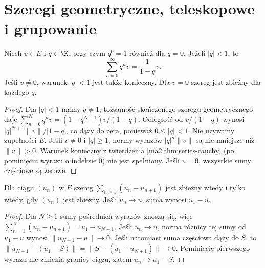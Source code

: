 \section{Szeregi geometryczne, teleskopowe i grupowanie}
\begin{twierdzenie}
\label{ma2:thm:vector-geometric}
Niech $v\in E$ i $q\in\K$, przy czym $q^0=1$ również dla $q=0$.
Jeżeli $|q|<1$, to
\[
 \sum_{n=0}^{\infty}q^n v=\frac{1}{1-q}v.
\]
Jeśli $v\ne0$, warunek $|q|<1$ jest także konieczny.
Dla $v=0$ szereg jest zbieżny dla każdego $q$.
\end{twierdzenie}
\begin{proof}
Dla $|q|<1$ mamy $q\ne1$; tożsamość skończonego szeregu
geometrycznego daje
$\sum_{n=0}^N q^n v=(1-q^{N+1})v/(1-q)$.
Odległość od $v/(1-q)$ wynosi
$|q|^{N+1}\|v\|/|1-q|$, co dąży do zera, ponieważ
$0\le |q|<1$. Nie używamy zupełności $E$.
Jeśli $v\ne0$ i $|q|\ge1$, normy wyrazów
$|q|^n\|v\|$ są nie mniejsze niż $\|v\|>0$.
Warunek konieczny z twierdzenia \ref{ma2:thm:series-cauchy}
(po pominięciu wyrazu o indeksie $0$) nie jest spełniony.
Jeśli $v=0$, wszystkie sumy częściowe są zerowe.
\end{proof}

\begin{twierdzenie}
\label{ma2:thm:vector-telescoping}
Dla ciągu $(u_n)$ w $E$ szereg $\sum_{n\ge1}(u_n-u_{n+1})$
jest zbieżny wtedy i tylko wtedy, gdy $(u_n)$ jest zbieżny.
Jeśli $u_n\to u$, suma wynosi $u_1-u$.
\end{twierdzenie}
\begin{proof}
Dla $N\ge1$ sumy pośrednich wyrazów znoszą się, więc
$\sum_{n=1}^N(u_n-u_{n+1})=u_1-u_{N+1}$.
Jeśli $u_n\to u$, norma różnicy tej sumy od $u_1-u$
wynosi $\|u_{N+1}-u\|\to0$.
Jeśli natomiast suma częściowa dąży do $S$, to
$\|u_{N+1}-(u_1-S)\|=\|S-(u_1-u_{N+1})\|\to0$.
Pominięcie pierwszego wyrazu nie zmienia granicy ciągu,
zatem $u_n\to u_1-S$.
\end{proof}

